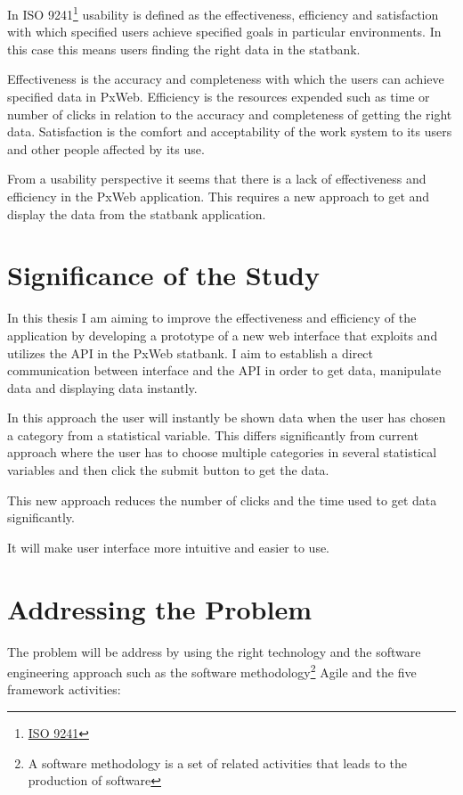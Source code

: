 In ISO 9241\footnote{\href{https://www.iso.org/search.html?q=ISO\%209241}{ISO 9241}\label{iso9241}} usability is defined as the effectiveness, efficiency and satisfaction with which specified users achieve specified goals in particular environments. In this case this means users finding the right data in the statbank.
 
Effectiveness is the accuracy and completeness with which the users can achieve specified data in PxWeb.  Efficiency is the resources expended such as time or number of clicks in relation to the accuracy and completeness of getting the right data. Satisfaction is the comfort and acceptability of the work system to its users and other people affected by its use.

From a usability perspective it seems that there is a lack of effectiveness and efficiency in the PxWeb application. This requires a new approach to get and display the data from the statbank application.

\section{Significance of the Study}
In this thesis I am aiming to improve the effectiveness and efficiency of the application by developing a prototype of a new web interface that exploits and utilizes the API in the PxWeb statbank. I aim to establish a direct communication between interface and the API in order to get data, manipulate data and displaying data instantly.

In this approach the user will instantly be shown data when the user has chosen a category from a statistical variable. This differs significantly from current approach where the user has to choose multiple categories in several statistical variables and then click the submit button to get the data. 

This new approach reduces the number of clicks and the time used to get data significantly.

It will make user interface more intuitive and easier to use.
 
\section{Addressing the Problem}
The problem will be address by using the right technology and the software engineering approach such as the software methodology\footnote{A software methodology is a set of related activities that leads to the production of software} Agile and the five framework activities:

